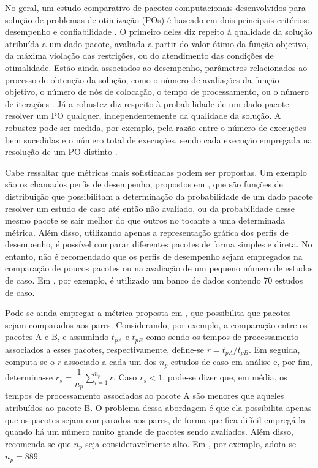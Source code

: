 No geral, um estudo comparativo de pacotes computacionais desenvolvidos para solução de problemas de otimização (POs) é baseado em dois principais critérios: desempenho e confiabilidade \cite{benson_interior-point_2000}. O primeiro deles diz repeito à qualidade da solução atribuída a um dado pacote, avaliada a partir do valor ótimo da função objetivo, da máxima violação das restrições, ou do atendimento das condições de otimalidade. Estão ainda associados ao desempenho, parâmetros relacionados ao processo de obtenção da solução, como o número de avaliações da função objetivo, o número de nós de colocação, o tempo de processamento, ou o número de iterações 
%
\cite{bongartz_numerical_1997, mittelmann_benchmarking_1998, dolan_benchmarking_2004, darby_hp-adaptive_2011, gruning_feedforward_2012, wang_optimal_2013, luis_tiago_de_freixo_ramos_numerical_2014, garcia-heras_comparison_2014, bock_evaluation_2016, baines_benchmark_2019, foroozandeh_numerical_2019, howell_altro_2019}. 
%
Já a robustez diz respeito à probabilidade de um dado pacote resolver um PO qualquer, independentemente da qualidade da solução. A robustez pode ser medida, por exemplo, pela razão entre o número de execuções bem sucedidas e o número total de execuções, sendo cada execução empregada na resolução de um PO distinto \cite{betts_performance_1993, bongartz_numerical_1997}. 

Cabe ressaltar que métricas mais sofisticadas podem ser propostas. Um exemplo são os chamados perfis de desempenho, propostos em , que são funções de distribuição que possibilitam a determinação da probabilidade de um dado pacote resolver um estudo de caso até então não avaliado, ou da probabilidade desse mesmo pacote se sair melhor do que outros no tocante a uma determinada métrica. Além disso, utilizando apenas a representação gráfica dos perfis de desempenho, é possível comparar diferentes pacotes de forma simples e direta. No entanto, não é recomendado que os perfis de desempenho sejam empregados na comparação de poucos pacotes ou na avaliação de um pequeno número de estudos de caso. Em , por exemplo, é utilizado um banco de dados contendo 70 estudos de caso. 

Pode-se ainda empregar a métrica proposta em , que possibilita que pacotes sejam comparados aos pares. Considerando, por exemplo, a comparação entre os pacotes A e B, e assumindo $ t_{pA} $ e $ t_{pB} $ como sendo os tempos de processamento associados a esses pacotes, respectivamente, define-se $ r = t_{pA}/t_{pB} $. Em seguida, computa-se o $ r $ associado a cada um dos $ n_p $ estudos de caso em análise e, por fim, determina-se $ r_s = \dfrac{1}{n_p} \sum_{i=1}^{n_p} r$. Caso $ r_s < 1 $, pode-se dizer que, em média, os tempos de processamento associados ao pacote A são menores que aqueles atribuídos ao pacote B. O problema dessa abordagem é que ela possibilita apenas que os pacotes sejam comparados aos pares, de forma que fica difícil empregá-la quando há um número muito grande de pacotes sendo avaliados. Além disso, recomenda-se que $ n_p $ seja consideravelmente alto. Em , por exemplo, adota-se $ n_p = 889 $.

